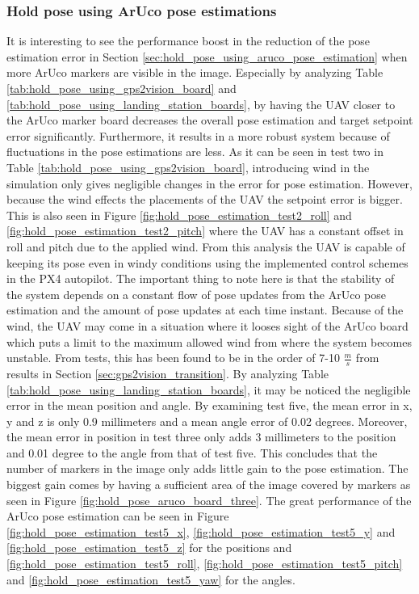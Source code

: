 \documentclass[../Head/report.tex]{subfiles}
\begin{document}
\subsubsection*{Hold pose using ArUco pose estimations}
It is interesting to see the performance boost in the reduction of the pose estimation error in Section \ref{sec:hold_pose_using_aruco_pose_estimation} when more ArUco markers are visible in the image. Especially by analyzing Table \ref{tab:hold_pose_using_gps2vision_board} and \ref{tab:hold_pose_using_landing_station_boards}, by having the UAV closer to the ArUco marker board decreases the overall pose estimation and target setpoint error significantly. Furthermore, it results in a more robust system because of fluctuations in the pose estimations are less. As it can be seen in test two in Table \ref{tab:hold_pose_using_gps2vision_board}, introducing wind in the simulation only gives negligible changes in the error for pose estimation. However, because the wind effects the placements of the UAV the setpoint error is bigger. This is also seen in Figure \ref{fig:hold_pose_estimation_test2_roll} and \ref{fig:hold_pose_estimation_test2_pitch} where the UAV has a constant offset in roll and pitch due to the applied wind. From this analysis the UAV is capable of keeping its pose even in windy conditions using the implemented control schemes in the PX4 autopilot. The important thing to note here is that the stability of the system depends on a constant flow of pose updates from the ArUco pose estimation and the amount of pose updates at each time instant. Because of the wind, the UAV may come in a situation where it looses sight of the ArUco board which puts a limit to the maximum allowed wind from where the system becomes unstable. From tests, this has been found to be in the order of 7-10 $\frac{m}{s}$ from results in Section \ref{sec:gps2vision_transition}. By analyzing Table \ref{tab:hold_pose_using_landing_station_boards}, it may be noticed the negligible error in the mean position and angle. By examining test five, the mean error in x, y and z is only 0.9 millimeters and a mean angle error of 0.02 degrees. Moreover, the mean error in position in test three only adds 3 millimeters to the position and 0.01 degree to the angle from that of test five. This concludes that the number of markers in the image only adds little gain to the pose estimation. The biggest gain comes by having a sufficient area of the image covered by markers as seen in Figure \ref{fig:hold_pose_aruco_board_three}. The great performance of the ArUco pose estimation can be seen in Figure \ref{fig:hold_pose_estimation_test5_x}, \ref{fig:hold_pose_estimation_test5_y} and \ref{fig:hold_pose_estimation_test5_z} for the positions and \ref{fig:hold_pose_estimation_test5_roll}, \ref{fig:hold_pose_estimation_test5_pitch} and \ref{fig:hold_pose_estimation_test5_yaw} for the angles. 
\end{document}
